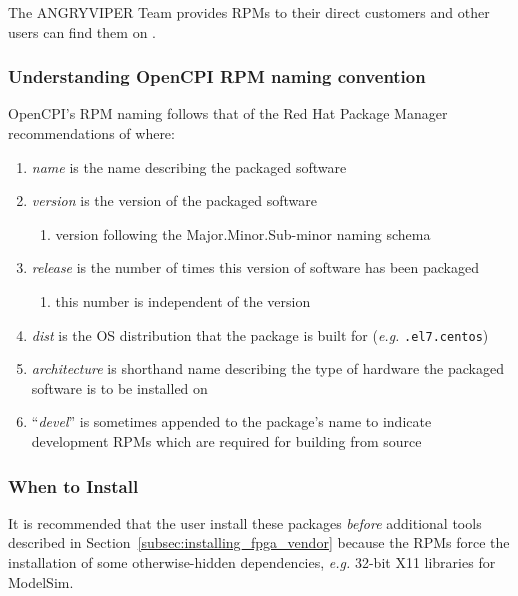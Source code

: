 The ANGRYVIPER Team provides RPMs to their direct customers and other users can find them on .

\subsubsection*{Understanding OpenCPI RPM naming convention}
\label{sec:understand_rpm_naming}
OpenCPI's RPM naming follows that of the Red Hat Package Manager recommendations of  where:

\begin{enumerate}
	\setcounter{enumi}{0} %
 	\item \textit{name} is the name describing the packaged software
 	\item \textit{version} is the version of the packaged software
 	\begin{enumerate}
	 	\item version following the Major.Minor.Sub-minor naming schema
	\end{enumerate}
 	\item \textit{release} is the number of times this version of software has been packaged
	\begin{enumerate}
	 	\item{this number is independent of the version}
	 \end{enumerate}
 	\item \textit{dist} is the OS distribution that the package is built for (\textit{e.g.} \texttt{.el7.centos})
 	\item \textit{architecture} is shorthand name describing the type of hardware the packaged software is to be installed on
 	\item ``\textit{devel}'' is sometimes appended to the package's name to indicate development RPMs which are required for building from source
\end{enumerate}

\subsubsection*{When to Install}
It is recommended that the user install these packages \textit{before} additional tools described in Section~\ref{subsec:installing_fpga_vendor} because the RPMs force the installation of some otherwise-hidden dependencies, \textit{e.g.} 32-bit X11 libraries for ModelSim.

